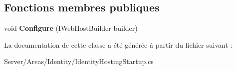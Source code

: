 \subsection*{Fonctions membres publiques}
\begin{DoxyCompactItemize}
\item 
\mbox{\label{class_mediwatch_1_1_server_1_1_areas_1_1_identity_1_1_identity_hosting_startup_a4206ebb6e9389e9fee2397a1454f7f9b}} 
void {\bfseries Configure} (I\+Web\+Host\+Builder builder)
\end{DoxyCompactItemize}


La documentation de cette classe a été générée à partir du fichier suivant \+:\begin{DoxyCompactItemize}
\item 
Server/\+Areas/\+Identity/Identity\+Hosting\+Startup.\+cs\end{DoxyCompactItemize}
